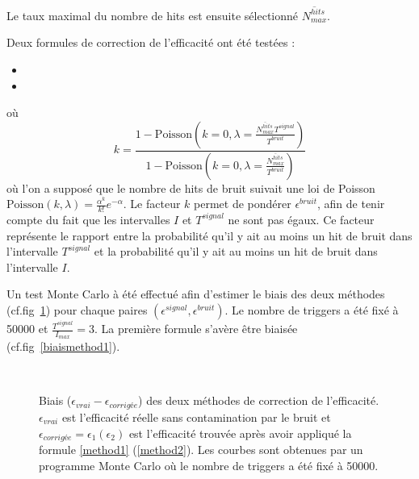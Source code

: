 Le taux maximal du nombre de hits est ensuite sélectionné $\overline{N^{hits}_{max}}$.

Deux formules de correction de l'efficacité ont été testées :
\begin{itemize}[label=$\bullet$]
	\item {}
	\item {}
\end{itemize}
où 
\begin{equation}
k=\frac{1-\mbox{Poisson}\left(k=0,\lambda=\frac{\overline{N^{hits}_{max}}T^{signal}}{T^{bruit}}\right)}{1-\mbox{Poisson}\left(k=0,\lambda=\frac{\overline{N^{hits}_{max}}}{T^{bruit}}\right)}
\end{equation}
où l'on a supposé que le nombre de hits de bruit suivait une loi de Poisson $\mbox{Poisson}\left(k,\lambda\right)=\frac{\alpha^k}{k!}e^{-\alpha}$. Le facteur $k$ permet de pondérer $\epsilon^{bruit}$, afin de tenir compte du fait que les intervalles $I$ et $T^{signal}$ ne sont pas égaux. Ce facteur représente le rapport entre la probabilité qu'il y ait au moins un hit de bruit dans l'intervalle $T^{signal}$ et la probabilité qu'il y ait au moins un hit de bruit dans l'intervalle $I$.

Un test Monte Carlo à été effectué afin d'estimer le biais des deux méthodes (cf.fig~\ref{biais}) pour chaque paires $\left(\epsilon^{signal},\epsilon^{bruit}\right)$. Le nombre de triggers a été fixé à \num{50000} et $\frac{T^{signal}}{I_{max}}=3$. La première formule s'avère être biaisée (cf.fig~\ref{biaismethod1}).

\tikzexternaldisable
\begin{figure}
\centering
{}
\\
\caption{Biais ($\epsilon_{vrai} -\epsilon_{corrigée}$) des deux méthodes de correction de l'efficacité. $\epsilon_{vrai}$ est l'efficacité réelle sans contamination par le bruit et $\epsilon_{corrigée}=\epsilon_{1}(\epsilon_{2})$ est l'efficacité trouvée après avoir appliqué la formule \ref{method1} (\ref{method2}). Les courbes sont obtenues par un programme Monte Carlo où le nombre de triggers a été fixé à \num{50000}.}
\label{biais}
\end{figure}

